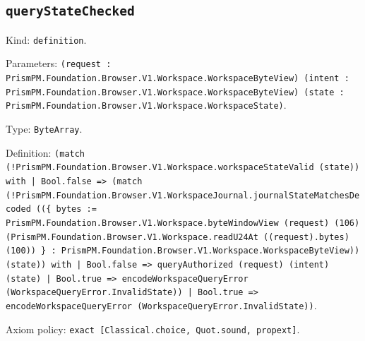 \documentclass[11pt]{article}
\begin{document}
\subsection*{\texttt{queryStateChecked}}
\noindent Kind: \texttt{definition}.\par
\noindent Parameters: \texttt{(request : PrismPM.Foundation.Browser.V1.Workspace.WorkspaceByteView) (intent : PrismPM.Foundation.Browser.V1.Workspace.WorkspaceByteView) (state : PrismPM.Foundation.Browser.V1.Workspace.WorkspaceState)}.\par
\noindent Type: \texttt{ByteArray}.\par
\noindent Definition: \texttt{(match (!PrismPM.Foundation.Browser.V1.Workspace.workspaceStateValid (state)) with | Bool.false => (match (!PrismPM.Foundation.Browser.V1.WorkspaceJournal.journalStateMatchesDecoded ((\{ bytes := PrismPM.Foundation.Browser.V1.Workspace.byteWindowView (request) (106) (PrismPM.Foundation.Browser.V1.Workspace.readU24At ((request).bytes) (100)) \} : PrismPM.Foundation.Browser.V1.Workspace.WorkspaceByteView)) (state)) with | Bool.false => queryAuthorized (request) (intent) (state) | Bool.true => encodeWorkspaceQueryError (WorkspaceQueryError.InvalidState)) | Bool.true => encodeWorkspaceQueryError (WorkspaceQueryError.InvalidState))}.\par
\noindent Axiom policy: \texttt{exact [Classical.choice, Quot.sound, propext]}.\par
\end{document}

